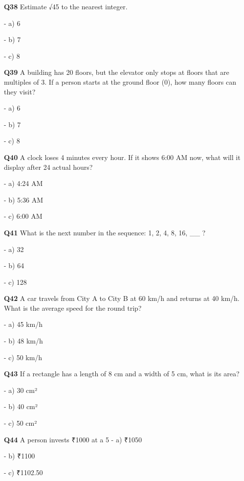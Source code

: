 \textbf{Q38} Estimate √45 to the nearest integer.\par
\quad - a) 6\par
\quad - b) 7\par
\quad - c) 8\par

\textbf{Q39} A building has 20 floors, but the elevator only stops at floors that are multiples of 3. If a person starts at the ground floor (0), how many floors can they visit?\par
\quad - a) 6\par
\quad - b) 7\par
\quad - c) 8\par

\textbf{Q40} A clock loses 4 minutes every hour. If it shows 6:00 AM now, what will it display after 24 actual hours?\par
\quad - a) 4:24 AM\par
\quad - b) 5:36 AM\par
\quad - c) 6:00 AM\par

\textbf{Q41} What is the next number in the sequence: 1, 2, 4, 8, 16, __ ?\par
\quad - a) 32\par
\quad - b) 64\par
\quad - c) 128\par

\textbf{Q42} A car travels from City A to City B at 60 km/h and returns at 40 km/h. What is the average speed for the round trip?\par
\quad - a) 45 km/h\par
\quad - b) 48 km/h\par
\quad - c) 50 km/h\par

\textbf{Q43} If a rectangle has a length of 8 cm and a width of 5 cm, what is its area?\par
\quad - a) 30 cm²\par
\quad - b) 40 cm²\par
\quad - c) 50 cm²\par

\textbf{Q44} A person invests ₹1000 at a 5 %
\quad - a) ₹1050\par
\quad - b) ₹1100\par
\quad - c) ₹1102.50\par

